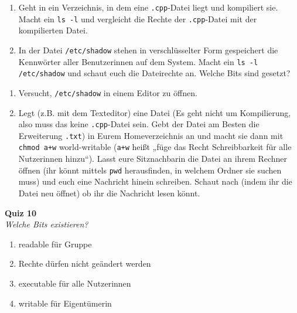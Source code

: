 \begin{praxis}
    \begin{enumerate}
        \item Geht in ein Verzeichnis, in dem eine \texttt{.cpp}-Datei liegt und
              kompiliert sie. Macht ein \texttt{ls -l} und vergleicht die Rechte der
              \texttt{.cpp}-Datei mit der kompilierten Datei.
        \item In der Datei \texttt{/etc/shadow} stehen in verschlüsselter Form
              gespeichert die Kennwörter aller Benutzerinnen auf dem System. Macht ein
              \texttt{ls -l /etc/shadow} und schaut euch die Dateirechte an. Welche
              Bits sind gesetzt?
    \end{enumerate}
\end{praxis}

\begin{spiel}
\begin{enumerate}
    \item Versucht, \texttt{/etc/shadow} in einem Editor zu öffnen.
    \item Legt (z.B. mit dem Texteditor) eine Datei (Es geht nicht um
        Kompilierung, also muss das keine \texttt{.cpp}-Datei sein. Gebt der
        Datei am Besten die Erweiterung \texttt{.txt}) in Eurem Homeverzeichnis
        an und macht sie dann mit \texttt{chmod a+w} world-writable
        (\texttt{a+w} heißt „füge das Recht Schreibbarkeit für alle Nutzerinnen
        hinzu“).  Lasst eure Sitznachbarin die Datei an ihrem Rechner öffnen
        (ihr könnt mittels \texttt{pwd} herausfinden, in welchem Ordner sie
        suchen muss) und euch eine Nachricht hinein schreiben. Schaut nach
        (indem ihr die Datei neu öffnet) ob ihr die Nachricht lesen könnt.
\end{enumerate}
\end{spiel}

\textbf{Quiz 10}\\
\textit{Welche Bits existieren?}
\begin{enumerate}[label=\alph]
    \item readable für Gruppe
    \item Rechte dürfen nicht geändert werden
    \item executable für alle Nutzerinnen
    \item writable für Eigentümerin
\end{enumerate}
